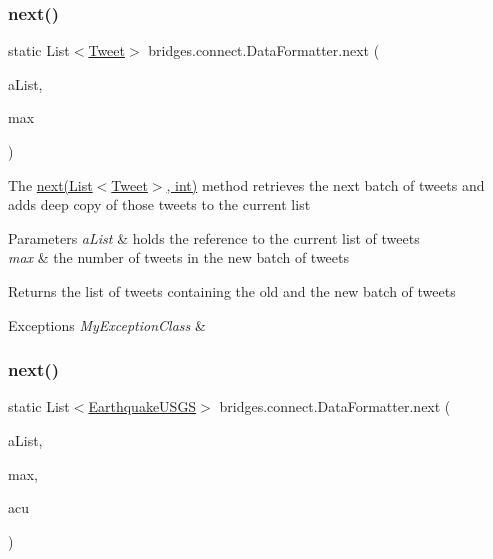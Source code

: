 \subsubsection{\texorpdfstring{next()}{next()}\hspace{0.1cm}{\footnotesize\ttfamily [1/2]}}
{\footnotesize\ttfamily static List$<$\hyperlink{classbridges_1_1data__src__dependent_1_1_tweet}{Tweet}$>$ bridges.\+connect.\+Data\+Formatter.\+next (\begin{DoxyParamCaption}\item[{List$<$ \hyperlink{classbridges_1_1data__src__dependent_1_1_tweet}{Tweet} $>$}]{a\+List,  }\item[{int}]{max }\end{DoxyParamCaption})\hspace{0.3cm}{\ttfamily [static]}}

The \hyperlink{classbridges_1_1connect_1_1_data_formatter_a3d0b2d2e0384d2a537bb61fbeb3d00a4}{next(\+List$<$\+Tweet$>$, int)} method retrieves the next batch of tweets and adds deep copy of those tweets to the current list 
\begin{DoxyParams}{Parameters}
{\em a\+List} & holds the reference to the current list of tweets \\
\hline
{\em max} & the number of tweets in the new batch of tweets \\
\hline
\end{DoxyParams}
\begin{DoxyReturn}{Returns}
the list of tweets containing the old and the new batch of tweets 
\end{DoxyReturn}

\begin{DoxyExceptions}{Exceptions}
{\em My\+Exception\+Class} & \\
\hline
\end{DoxyExceptions}
\hypertarget{classbridges_1_1connect_1_1_data_formatter_ad451dd96b927702127d383e85fc98661}{}\label{classbridges_1_1connect_1_1_data_formatter_ad451dd96b927702127d383e85fc98661} 
\subsubsection{\texorpdfstring{next()}{next()}\hspace{0.1cm}{\footnotesize\ttfamily [2/2]}}
{\footnotesize\ttfamily static List$<$\hyperlink{classbridges_1_1data__src__dependent_1_1_earthquake_u_s_g_s}{Earthquake\+U\+S\+GS}$>$ bridges.\+connect.\+Data\+Formatter.\+next (\begin{DoxyParamCaption}\item[{List$<$ \hyperlink{classbridges_1_1data__src__dependent_1_1_earthquake_u_s_g_s}{Earthquake\+U\+S\+GS} $>$}]{a\+List,  }\item[{int}]{max,  }\item[{\hyperlink{classbridges_1_1data__src__dependent_1_1_u_s_g_saccount}{U\+S\+G\+Saccount}}]{acu }\end{DoxyParamCaption})\hspace{0.3cm}{\ttfamily [static]}}

